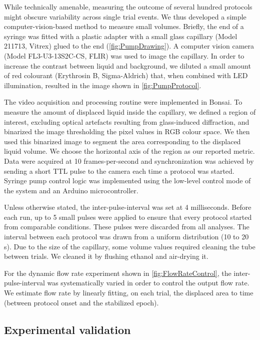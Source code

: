 While technically amenable, measuring the outcome of several hundred protocols might obscure variability across single trial events. We thus developed a simple computer-vision-based method to measure small volumes. Briefly, the end of a syringe was fitted with a plastic adapter with a small glass capillary (Model 211713, Vitrex) glued to the end (\ref{fig:PumpDrawing}). A computer vision camera (Model FL3-U3-13S2C-CS, FLIR) was used to image the capillary.
In order to increase the contrast between liquid and background, we diluted a small amount of red colourant (Erythrosin B, Sigma-Aldrich) that, when combined with LED illumination, resulted in the image shown in \ref{fig:PumpProtocol}.

The video acquisition and processing routine were implemented in Bonsai. To measure the amount of displaced liquid inside the capillary, we defined a region of interest, excluding optical artefacts resulting from glass-induced diffraction, and binarized the image thresholding the pixel values in RGB colour space. We then used this binarized image to segment the area corresponding to the displaced liquid volume. We choose the horizontal axis of the region as our reported metric. Data were acquired at 10 frames-per-second and synchronization was achieved by sending a short TTL pulse to the camera each time a protocol was started. Syringe pump control logic was implemented using the low-level control mode of the system and an Arduino microcontroller.

Unless otherwise stated, the inter-pulse-interval was set at 4 milliseconds. Before each run, up to 5 small pulses were applied to ensure that every protocol started from comparable conditions. These pulses were discarded from all analyses. The interval between each protocol was drawn from a uniform distribution (10 to 20 s). Due to the size of the capillary, some volume values required cleaning the tube between trials. We cleaned it by flushing ethanol and air-drying it.

For the dynamic flow rate experiment shown in \ref{fig:FlowRateControl}, the inter-pulse-interval was systematically varied in order to control the output flow rate. We estimate flow rate by linearly fitting, on each trial, the displaced area to time (between protocol onset and the stabilized epoch).

\subsection*{Experimental validation}

